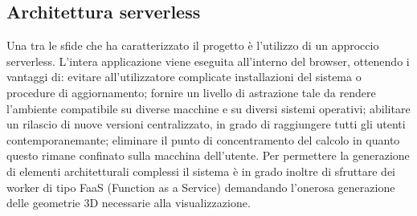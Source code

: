 \subsection{Architettura serverless}
Una tra le sfide che ha caratterizzato il progetto è l'utilizzo di un approccio serverless. L'intera applicazione viene eseguita all'interno del browser, ottenendo i vantaggi di: evitare all'utilizzatore complicate installazioni del sistema o procedure di aggiornamento; fornire un livello di astrazione tale da rendere l'ambiente compatibile su diverse macchine e su diversi sistemi operativi; abilitare un rilascio di nuove versioni centralizzato, in grado di raggiungere tutti gli utenti contemporanemante; eliminare il punto di concentramento del calcolo in quanto questo rimane confinato sulla macchina dell'utente.
Per permettere la generazione di elementi architetturali complessi il sistema è in grado inoltre di sfruttare dei worker di tipo FaaS (Function as a Service) demandando l'onerosa generazione delle geometrie 3D necessarie alla visualizzazione.